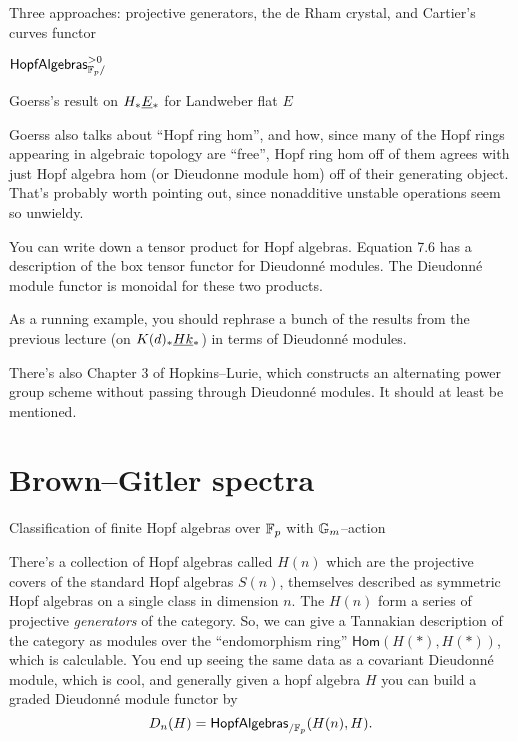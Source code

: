 Three approaches: projective generators, the de Rham crystal, and Cartier's curves functor

$\mathsf{HopfAlgebras}^{> 0}_{\mathbb F_p/}$

Goerss's result on $H_* \smash{\underline{E}}_{*}$ for Landweber flat $E$



Goerss also talks about ``Hopf ring hom'', and how, since many of the Hopf rings appearing in algebraic topology are ``free'', Hopf ring hom off of them agrees with just Hopf algebra hom (or Dieudonne module hom) off of their generating object.  That's probably worth pointing out, since nonadditive unstable operations seem so unwieldy.


You can write down a tensor product for Hopf algebras.  Equation 7.6 has a description of the box tensor functor for Dieudonn\'e modules.  The Dieudonn\'e module functor is monoidal for these two products.


As a running example, you should rephrase a bunch of the results from the previous lecture (on $K(d)_* \smash{\underline{Hk}}_{*}$) in terms of Dieudonn\'e modules.


There's also Chapter 3 of Hopkins--Lurie, which constructs an alternating power group scheme without passing through Dieudonn\'e modules.  It should at least be mentioned.







\section{Brown--Gitler spectra}

Classification of finite Hopf algebras over $\mathbb F_p$ with $\mathbb G_m$--action

There's a collection of Hopf algebras called $H(n)$ which are the projective covers of the standard Hopf algebras $S(n)$, themselves described as symmetric Hopf algebras on a single class in dimension $n$.  The $H(n)$ form a series of projective \emph{generators} of the category.  So, we can give a Tannakian description of the category as modules over the ``endomorphism ring'' $\mathsf{Hom}(H(*), H(*))$, which is calculable.  You end up seeing the same data as a covariant Dieudonn\'e module, which is cool, and generally given a hopf algebra $H$ you can build a graded Dieudonn\'e module functor by \[D_n(H) = \mathsf{HopfAlgebras}_{/\mathbb F_p}(H(n), H).\]

